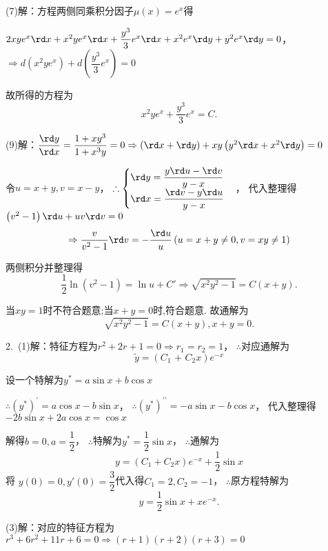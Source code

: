   (7)解：方程两侧同乘积分因子$\mu \left( x \right) = {e^x}$得

  $2xy{e^x}\rd x + {x^2}y{e^x}\rd x + \dfrac{{{y^3}}}{3}{e^x}\rd x + {x^2}{e^x}\rd y + {y^2}{e^x}\rd y = 0$，
  $ \Rightarrow d\left( {{x^2}y{e^x}} \right) + d\left( {\dfrac{{{y^3}}}{3}{e^x}} \right) = 0$

  故所得的方程为\[{x^2}y{e^x} + \dfrac{{{y^3}}}{3}{e^x} = C.\]

  (9)解：$\dfrac {{\rd y}}{{\rd x}} = \dfrac{{1 + x{y^3}}}{{1 + {x^3}y}} = 0 \Rightarrow \left( {\rd x + \rd y} \right) + xy\left( {{y^2}\rd x + {x^2}\rd y} \right) = 0$

  令$u = x + y,v = x - y$，
  $\therefore \begin{cases}
    {\rd y = \dfrac{{y\rd u - \rd v}}{{y - x}}} \\
    {\rd x = \dfrac{{\rd v - y\rd u}}{{y - x}}}
  \end{cases}$，
  代入整理得$\left( {{v^2} - 1} \right)\rd u + uv\rd v = 0$
  \[ \Rightarrow \dfrac{v}{{{v^2} - 1}}\rd v =  - \dfrac{{\rd u}}{u}\left( {u = x + y \ne 0,v = xy \ne 1} \right)\]

  两侧积分并整理得\[\dfrac{1}{2}\ln \left( {{v^2} - 1} \right) = \ln u + C' \Rightarrow \sqrt {{x^2}{y^2} - 1}  = C\left( {x + y} \right).\]

  当$xy = 1$时不符合题意;当$x+y = 0$时,符合题意.
  故通解为
  \[\sqrt {{x^2}{y^2} - 1}  = C\left( {x + y} \right),x + y = 0.\]

  2.~(1)解：特征方程为${r^2} + 2r + 1 = 0 \Rightarrow {r_1} = {r_2} = 1$，
  $\therefore $对应通解为
  \[\tilde y = \left( {{C_1}{\text{ + }}{C_2}x} \right){e^{ - x}}\]

  设一个特解为${y^*} = a\sin x + b\cos x$

  $\therefore {\left( {{y^*}} \right)^\prime } = a\cos x - b\sin x$，
  $\therefore {\left( {{y^*}} \right)^{\prime \prime }} =  - a\sin x - b\cos x$，
  代入整理得$- 2b\sin x + 2a\cos x = \cos x$

  解得$b = 0,a = \dfrac{1}{2}$，
  $\therefore $特解为${y^*} = \dfrac{1}{2}\sin x$，
  $\therefore $通解为
  \[y = \left( {{C_1} + {C_2}x} \right){e^{ - x}} + \dfrac{1}{2}\sin x\]
  将 $y\left( 0 \right) = 0,y'\left( 0 \right) = \dfrac{3}{2}$代入得${C_1} = 2,{C_2 = - 1}$，
  $\therefore $原方程特解为
  \[y = \dfrac{1}{2}\sin x + x{e^{ - x}}.\]

  (3)解：对应的特征方程为${r^3} + 6{r^2} + 11r + 6 = 0 \Rightarrow \left( {r + 1} \right)\left( {r + 2} \right)\left( {r + 3} \right) = 0$

